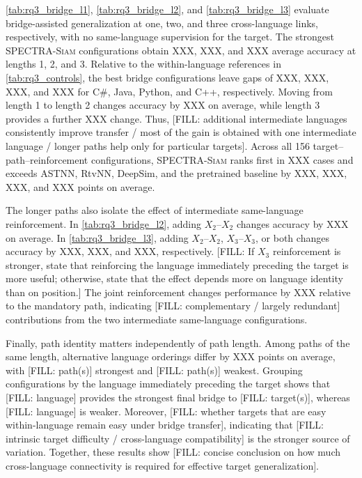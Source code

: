 \documentclass[final,5p,times,twocolumn]{elsarticle}
\newcommand{\method}{\textsc{SPECTRA-Siam}}
\theoremstyle{plain}
\begin{document}
\autoref{tab:rq3_bridge_l1}, \autoref{tab:rq3_bridge_l2}, and \autoref{tab:rq3_bridge_l3} evaluate bridge-assisted generalization at one, two, and three cross-language links, respectively, with no same-language supervision for the target. The strongest \method{} configurations obtain XXX, XXX, and XXX average accuracy at lengths 1, 2, and 3. Relative to the within-language references in \autoref{tab:rq3_controls}, the best bridge configurations leave gaps of XXX, XXX, XXX, and XXX for C\#, Java, Python, and C++, respectively. Moving from length 1 to length 2 changes accuracy by XXX on average, while length 3 provides a further XXX change. Thus, [FILL: additional intermediate languages consistently improve transfer / most of the gain is obtained with one intermediate language / longer paths help only for particular targets]. Across all 156 target--path--reinforcement configurations, \method{} ranks first in XXX cases and exceeds ASTNN, RtvNN, DeepSim, and the pretrained baseline by XXX, XXX, XXX, and XXX points on average.

The longer paths also isolate the effect of intermediate same-language reinforcement. In \autoref{tab:rq3_bridge_l2}, adding $X_2$--$X_2$ changes accuracy by XXX on average. In \autoref{tab:rq3_bridge_l3}, adding $X_2$--$X_2$, $X_3$--$X_3$, or both changes accuracy by XXX, XXX, and XXX, respectively. [FILL: If $X_3$ reinforcement is stronger, state that reinforcing the language immediately preceding the target is more useful; otherwise, state that the effect depends more on language identity than on position.] The joint reinforcement changes performance by XXX relative to the mandatory path, indicating [FILL: complementary / largely redundant] contributions from the two intermediate same-language configurations.

Finally, path identity matters independently of path length. Among paths of the same length, alternative language orderings differ by XXX points on average, with [FILL: path(s)] strongest and [FILL: path(s)] weakest. Grouping configurations by the language immediately preceding the target shows that [FILL: language] provides the strongest final bridge to [FILL: target(s)], whereas [FILL: language] is weaker. Moreover, [FILL: whether targets that are easy within-language remain easy under bridge transfer], indicating that [FILL: intrinsic target difficulty / cross-language compatibility] is the stronger source of variation. Together, these results show [FILL: concise conclusion on how much cross-language connectivity is required for effective target generalization].
\end{document}
